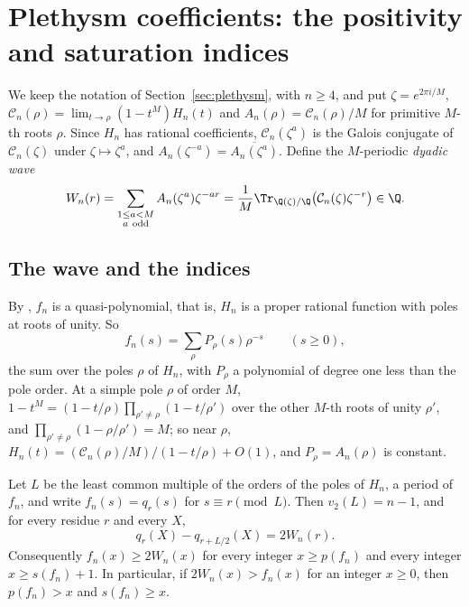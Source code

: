 \section{Plethysm coefficients: the positivity and saturation indices}\label{sec:indices}

We keep the notation of Section~\ref{sec:plethysm}, with $n\ge4$, and put
$\zeta=e^{2\pi i/M}$, $\mathcal C_n(\rho)=\lim_{t\to\rho}(1-t^M)H_n(t)$ and
$A_n(\rho)=\mathcal C_n(\rho)/M$ for primitive $M$-th roots $\rho$. Since
$H_n$ has rational coefficients, $\mathcal C_n(\zeta^a)$ is the Galois
conjugate of $\mathcal C_n(\zeta)$ under $\zeta\mapsto\zeta^a$, and
$A_n(\zeta^{-a})=\overline{A_n(\zeta^a)}$. Define the $M$-periodic
\emph{dyadic wave}
\begin{equation}\label{eq:wave}
 W_n(r)=\sum_{\substack{1\le a<M\\a\ \mathrm{odd}}}A_n(\zeta^a)\zeta^{-ar}
 =\frac1M\Tr_{\Q(\zeta)/\Q}\bigl(\mathcal C_n(\zeta)\zeta^{-r}\bigr)\in\Q .
\end{equation}

\subsection{The wave and the indices}

By \cite[Theorem 1.6.1(b), p.~21]{GCT6}, $f_n$ is a quasi-polynomial, that is,
$H_n$ is a proper rational function with poles at roots of unity. So
\begin{equation}\label{eq:fourier}
 f_n(s)=\sum_\rho P_\rho(s)\rho^{-s}\qquad(s\ge0),
\end{equation}
the sum over the poles $\rho$ of $H_n$, with $P_\rho$ a polynomial of degree
one less than the pole order. At a simple pole $\rho$ of order $M$,
$1-t^M=(1-t/\rho)\prod_{\rho'\ne\rho}(1-t/\rho')$ over the other $M$-th roots
of unity $\rho'$, and $\prod_{\rho'\ne\rho}(1-\rho/\rho')=M$; so near $\rho$,
$H_n(t)=(\mathcal C_n(\rho)/M)/(1-t/\rho)+O(1)$, and $P_\rho=A_n(\rho)$ is
constant.

\begin{proposition}\label{prop:wave}
Let $L$ be the least common multiple of the orders of the poles of $H_n$, a
period of $f_n$, and write $f_n(s)=q_r(s)$ for $s\equiv r\pmod L$. Then
$v_2(L)=n-1$, and for every residue $r$ and every $X$,
\begin{equation}\label{eq:waveidentity}
 q_r(X)-q_{r+L/2}(X)=2W_n(r).
\end{equation}
Consequently $f_n(x)\ge2W_n(x)$ for every integer $x\ge p(f_n)$ and every
integer $x\ge s(f_n)+1$. In particular, if $2W_n(x)>f_n(x)$ for an integer
$x\ge0$, then $p(f_n)>x$ and $s(f_n)\ge x$.
\end{proposition}

